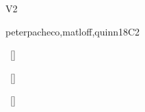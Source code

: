\begin{syllabus}
\begin{competences}{V2}
    \item {}
    \item {}
    \item {}
    \item {}
    \item {}
    \item {} 	
\end{competences}

\begin{unit}{\PDParallelismFundamentals}{}{peterpacheco,matloff,quinn}{18}{C2}
\begin{topics}%
    \item \PDParallelismFundamentalsTopicMultiple
    \item \PDParallelismFundamentalsTopicGoals
    \item \PDParallelismFundamentalsTopicParallelism
    \item \PDParallelismFundamentalsTopicProgramming
\end{topics}    
\begin{learningoutcomes}%
    \item \PDParallelismFundamentalsLODistinguishUsing~[\Familiarity] %
    \item \PDParallelismFundamentalsLODistinguishMultiple~[\Familiarity] %
    \item \PDParallelismFundamentalsLODistinguishData~[\Familiarity] %
\end{learningoutcomes}%
\end{unit}


\end{syllabus}
